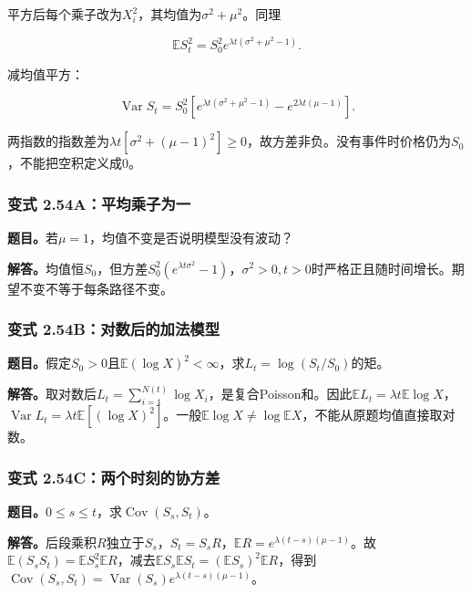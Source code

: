 \documentclass[12pt,a4paper,UTF8,fontset=fandol]{ctexart}
\begin{document}
平方后每个乘子改为\(X_i^2\)，其均值为\(\sigma^2+\mu^2\)。同理

\[\mathbb ES_t^2=S_0^2 e^{\lambda t(\sigma^2+\mu^2-1)}.\]

减均值平方：

\[\boxed{\operatorname{Var}S_t=S_0^2\left[
 e^{\lambda t(\sigma^2+\mu^2-1)}-e^{2\lambda t(\mu-1)}\right].}\]

两指数的指数差为\(\lambda t[\sigma^2+(\mu-1)^2]\ge0\)，故方差非负。没有事件时价格仍为\(S_0\)，不能把空积定义成0。

\subsubsection{变式
2.54A：平均乘子为一}\label{ux53d8ux5f0f-2.54aux5e73ux5747ux4e58ux5b50ux4e3aux4e00}

\textbf{题目。}若\(\mu=1\)，均值不变是否说明模型没有波动？

\textbf{解答。}均值恒\(S_0\)，但方差\(S_0^2(e^{\lambda t\sigma^2}-1)\)，\(\sigma^2>0,t>0\)时严格正且随时间增长。期望不变不等于每条路径不变。

\subsubsection{变式
2.54B：对数后的加法模型}\label{ux53d8ux5f0f-2.54bux5bf9ux6570ux540eux7684ux52a0ux6cd5ux6a21ux578b}

\textbf{题目。}假定\(S_0>0\)且\(\mathbb E(\log X)^2<\infty\)，求\(L_t=\log(S_t/S_0)\)的矩。

\textbf{解答。}取对数后\(L_t=\sum_{i=1}^{N(t)}\log X_i\)，是复合Poisson和。因此\(\mathbb EL_t=\lambda t\mathbb E\log X\)，\(\operatorname{Var}L_t=\lambda t\mathbb E[(\log X)^2]\)。一般\(\mathbb E\log X\ne\log\mathbb EX\)，不能从原题均值直接取对数。

\subsubsection{变式
2.54C：两个时刻的协方差}\label{ux53d8ux5f0f-2.54cux4e24ux4e2aux65f6ux523bux7684ux534fux65b9ux5dee}

\textbf{题目。}\(0\le s\le t\)，求\(\operatorname{Cov}(S_s,S_t)\)。

\textbf{解答。}后段乘积\(R\)独立于\(S_s\)，\(S_t=S_sR\)，\(\mathbb ER=e^{\lambda(t-s)(\mu-1)}\)。故\(\mathbb E(S_sS_t)=\mathbb ES_s^2\mathbb ER\)，减去\(\mathbb ES_s\mathbb ES_t=(\mathbb ES_s)^2\mathbb ER\)，得到\(\operatorname{Cov}(S_s,S_t)=\operatorname{Var}(S_s)e^{\lambda(t-s)(\mu-1)}\)。
\end{document}
